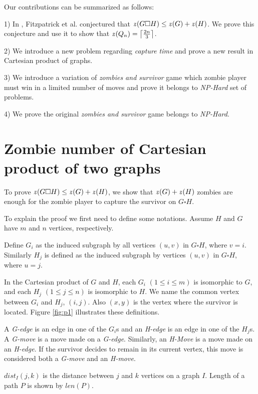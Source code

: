 \documentclass[1p]{elsarticle}
\DeclarePairedDelimiter\ceil{\lceil}{\rceil} \DeclarePairedDelimiter\floor{\lfloor}{\rfloor}
\newcommand{\zn}{\ooalign{$z$\cr\hfil\rule[.5ex]{.2em}{.08ex}\hfil\cr}}
\begin{document}
Our contributions can be summarized as follows:

1) In \cite{Fitz16}, Fitzpatrick et al. conjectured that $\zn(G \square H) \leq \zn(G) + \zn(H)$. We prove this conjecture and
use it to show that $\zn(Q_n) = \ceil*{\frac{2n}{3}}$. 

2) We introduce a new problem regarding {\it capture time} and prove a new result in Cartesian product of graphs.

3) We introduce a variation of {\it zombies and survivor} game which zombie player must win in a limited number of
moves and prove it belongs to {\it NP-Hard} set of problems.

4) We prove the original {\it zombies and survivor} game belongs to {\it NP-Hard}.


\section{Zombie number of Cartesian product of two graphs}\label{conj-proof}

To prove $\zn(G \square H) \leq \zn(G) + \zn(H)$, we show that $\zn(G) + \zn(H)$ zombies are enough for the zombie player to
capture the survivor on $G \square H$.

To explain the proof we first need to define some notations. Assume $H$ and $G$ have $m$ and $n$ vertices,
respectively. 

Define $G_{i}$ as the induced subgraph by all vertices $(u,v)$ in $G \square H$, where $v=i$. Similarly
$H_{j}$ is defined as the induced subgraph by vertices $(u,v)$ in $G \square H$, where $u=j$.

In the Cartesian product of $G$ and $H$, each $G_{i}$ $(1 \leq i \leq m)$ is isomorphic to $G$, and each $H_{j}$ $(1
\leq j \leq n)$ is isomorphic to $H$. We name the common vertex between $G_{i}$ and $H_{j}$, $(i,j)$. Also $(x,y)$ is
the vertex where the survivor is located. Figure \ref{fig:p1} illustrates these definitions.

A {\it G-edge} is an edge in one of the $G_{i}$s and an {\it H-edge} is an edge in one of the $H_{j}$s. A {\it G-move}
is a move made on a {\it G-edge}. Similarly, an {\it H-Move} is a move made on an {\it H-edge}. If the survivor decides
to remain in its current vertex, this move is considered both a {\it G-move} and an {\it H-move}. 

$dist_I(j,k)$ is the distance between $j$ and $k$ vertices on a graph $I$. Length of a path $P$ is shown by $len(P)$. 
\end{document}
